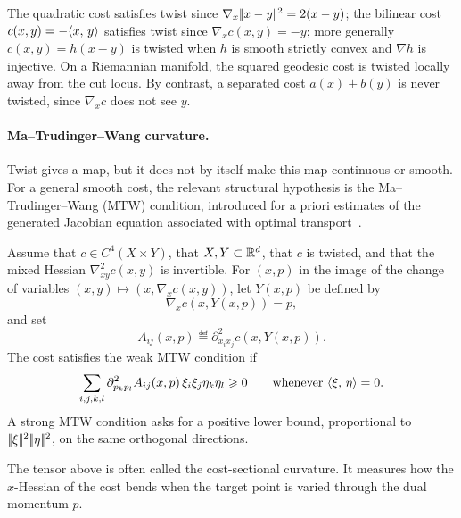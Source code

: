 The quadratic cost satisfies twist since $\nabla_x|\!| x-y |\!|^2=2(x-y)$; the bilinear cost $c(x,y)=-\langle x,\,y\rangle$ satisfies twist since $\nabla_x c(x,y)=-y$; more generally $c(x,y)=h(x-y)$ is twisted when $h$ is smooth strictly convex and $\nabla h$ is injective. On a Riemannian manifold, the squared geodesic cost is twisted locally away from the cut locus. By contrast, a separated cost $a(x)+b(y)$ is never twisted, since $\nabla_xc$ does not see $y$.

\paragraph{Ma--Trudinger--Wang curvature.}

Twist gives a map, but it does not by itself make this map continuous or smooth. For a general smooth cost, the relevant structural hypothesis is the Ma--Trudinger--Wang (MTW) condition, introduced for a priori estimates of the generated Jacobian equation associated with optimal transport~\cite{ma2005regularity,trudinger2001monge}.

\begin{defn}\label{def-mtw-condition}
	Assume that $c\in C^4(X\times Y)$, that $X,Y\subset\mathbb{R}^d$, that $c$ is twisted, and that the mixed Hessian $\nabla^2_{xy}c(x,y)$ is invertible. For $(x,p)$ in the image of the change of variables $(x,y)\mapsto(x,\nabla_xc(x,y))$, let $Y(x,p)$ be defined by
	\[
		\nabla_x c(x,Y(x,p))=p,
	\]
	and set
	\[
		A_{ij}(x,p)\eqdef \partial^2_{x_i x_j}c(x,Y(x,p)).
	\]
	The cost satisfies the weak MTW condition if
	\[
		\sum_{i,j,k,l}\partial^2_{p_kp_l} A_{ij}(x,p)\,\xi_i\xi_j\eta_k\eta_l\geqslant0
		\qquad\text{whenever }\langle \xi,\,\eta\rangle=0.
	\]
	A strong MTW condition asks for a positive lower bound, proportional to $|\!| \xi |\!|^2|\!| \eta |\!|^2$, on the same orthogonal directions.
\end{defn}

The tensor above is often called the cost-sectional curvature. It measures how the $x$-Hessian of the cost bends when the target point is varied through the dual momentum $p$.

